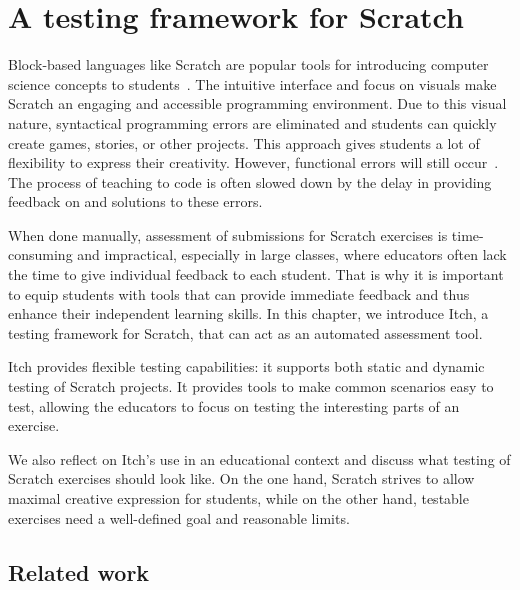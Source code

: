 \documentclass[../main]{subfiles}
\begin{document}
\chapter{A testing framework for Scratch}\label{ch:itch}


Block-based languages like Scratch are popular tools for introducing computer science concepts to students~\autocite{bauLearnableProgrammingBlocks2017}.
The intuitive interface and focus on visuals make Scratch an engaging and accessible programming environment.
Due to this visual nature, syntactical programming errors are eliminated and students can quickly create games, stories, or other projects.
This approach gives students a lot of flexibility to express their creativity.
However, functional errors will still occur~\autocite{zellerWhyProgramsFail2009a}.
The process of teaching to code is often slowed down by the delay in providing feedback on and solutions to these errors.

When done manually, assessment of submissions for Scratch exercises is time-consuming and impractical, especially in large classes, where educators often lack the time to give individual feedback to each student.
That is why it is important to equip students with tools that can provide immediate feedback and thus enhance their independent learning skills.
In this chapter, we introduce Itch, a testing framework for Scratch, that can act as an automated assessment tool.

Itch provides flexible testing capabilities: it supports both static and dynamic testing of Scratch projects.
It provides tools to make common scenarios easy to test, allowing the educators to focus on testing the interesting parts of an exercise.

We also reflect on Itch's use in an educational context and discuss what testing of Scratch exercises should look like.
On the one hand, Scratch strives to allow maximal creative expression for students, while on the other hand, testable exercises need a well-defined goal and reasonable limits.

\section{Related work}\label{sec:related-work}
\end{document}

